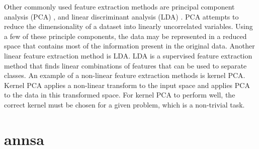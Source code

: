 
Other commonly used feature extraction methods are principal component analysis (PCA) \cite{Jolliffe2002}, and linear discriminant analysis (LDA) \cite{Welling2007}. PCA attempts to reduce the dimensionality of a dataset into linearly uncorrelated variables. Using a few of these principle components, the data may be represented in a reduced space that contains most of the information present in the original data. Another linear feature extraction method is LDA. LDA is a supervised feature extraction method that finds linear combinations of features that can be used to separate classes. An example of a non-linear feature extraction methods is kernel PCA. Kernel PCA applies a non-linear transform to the input space and applies PCA to the data in this transformed space. For kernel PCA to perform well, the correct kernel must be chosen for a given problem, which is a non-trivial task.











\section{annsa}

